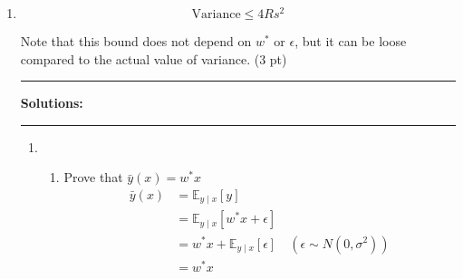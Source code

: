 \documentclass{article}
\theoremstyle{definition}
\theoremstyle{remark}
\newenvironment{Q}
    {%
      \clearpage
      \item
    }
    {%
      \phantom{s}
      \bigskip
    \hrule
    \vspace{1em}
      \textbf{Solutions: } \\
    \hrule
    }
\begin{document}
\begin{enumerate}[font={\Large\bfseries},left=0pt]
\begin{Q}
\begin{enumerate}
			      $$
				      \text{Variance} \leq 4Rs^2
			      $$

			      Note that this bound does not depend on $w^*$ or $\epsilon$, but it can be loose compared to the actual value of variance. (3 pt)
		\end{enumerate}

	\end{Q}

	\begin{enumerate}
		\item \begin{enumerate}

			      \item Prove that $\bar{y}(x) = w^*x$ \\
			            \begin{align}
				            \bar{y}(x) & = \mathbb{E}_{y \mid x} [y]                                                   \\
				                       & = \mathbb{E}_{y \mid x} [w^*x + \epsilon]                                     \\
				                       & = w^*x + \mathbb{E}_{y \mid x}[\epsilon] \quad (\epsilon \sim N(0, \sigma^2)) \\
				                       & = w^*x
			            \end{align}


\end{enumerate}
\end{enumerate}
\end{enumerate}
\end{document}
